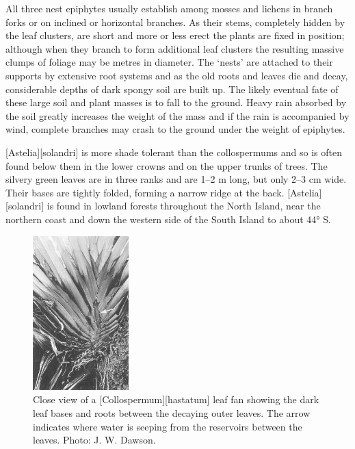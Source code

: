 All three nest epiphytes usually establish among mosses and lichens in branch forks or on inclined or horizontal branches.
As their stems, completely hidden by the leaf clusters, are short and more or less erect the plants are fixed in position; although when they branch to form additional leaf clusters the resulting massive clumps of foliage may be metres in diameter.
The `nests' are attached to their supports by extensive root systems and as the old roots and leaves die and decay, considerable depths of dark spongy soil are built up.
The likely eventual fate of these large soil and plant masses is to fall to the ground.
Heavy rain absorbed by the soil greatly increases the weight of the mass and if the rain is accompanied by wind, complete branches may crash to the ground under the weight of epiphytes.

[Astelia][solandri] is more shade tolerant than the collospermums and so is often found below them in the lower crowns and on the upper trunks of trees.
The silvery green leaves are in three ranks and are 1–2 m long, but only 2--3 cm wide.
Their bases are tightly folded, forming a narrow ridge at the back. [Astelia][solandri] is found in lowland forests throughout the North Island, near the northern coast and down the western side of the South Island to about 44° S.

\begin{figure}
	\includegraphics[width=0.33\textwidth]{graphics/figure41collospermum.jpg}
	\centering
	\caption[Close view of a Collospermum hastatum leaf fan]{Close view of a [Collospermum][hastatum] leaf fan showing the dark leaf bases and roots between the decaying outer leaves.
	The arrow indicates where water is seeping from the reservoirs between the leaves.
	Photo: J. W. Dawson.}%
	\label{fig:41collospermum}
\end{figure}

